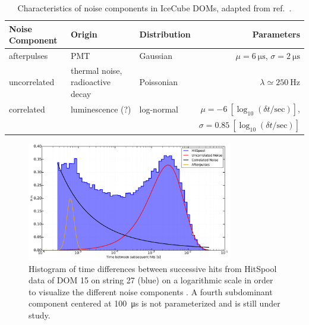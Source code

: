 \begin{table}[h!]
\caption{Characteristics of noise components in IceCube DOMs, adapted from
  ref.~\cite{stanisha_noise_14}.}
  \centering
  \footnotesize
\begin{tabularx}{\textwidth}{lXXr}
\toprule
Noise Component& Origin & Distribution & Parameters \\
\midrule
afterpulses & PMT & Gaussian & $\mu = \SI{6}{\micro\second}$, $\sigma = \SI{2}{\micro\second}$\\
uncorrelated & thermal noise, \newline radioactive decay & Poissonian & $\lambda \simeq \SI{250}{\hertz}$\\
correlated & luminescence (?) & log-normal &
$\mu = \num{-6}\ [\log_{10}(\delta t/\mathrm{sec})]$, \\
& & & 
$\sigma = \num{0.85}\ [\log_{10}(\delta t/\mathrm{sec})]$ \\
\bottomrule
\end{tabularx}
\label{tab:noise}
\end{table}

\begin{figure}[!h]
 \centering
  \includegraphics[width=0.8\textwidth]{graphics/dom/performance/darknoise/SingleDOM_HitSpool_Hits_deltaT_fits_example.pdf}
 \caption{Histogram of time differences between successive hits from HitSpool data of
DOM 15 on string 27 (blue) on a logarithmic scale in order to visualize the
different noise components \cite{heereman2015hitspooling}.  A fourth
subdominant component centered at \SI{100}{\micro\second} is not parameterized and is still under study.}
 \label{fig:darknoise_deltaT_components}
\end{figure}

